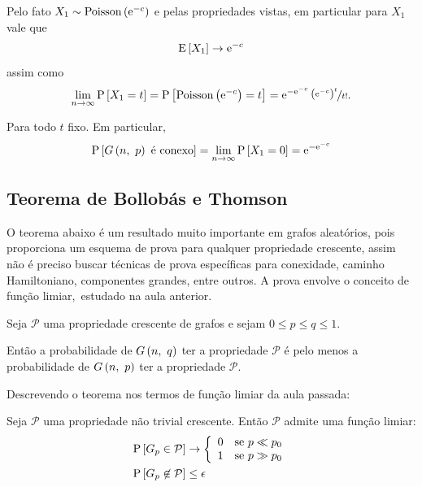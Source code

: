Pelo fato $X_1\sim\mathrm{Poisson}\left(\mathrm{e}^{-c}\vphantom{1j}\right)$ e pelas propriedades vistas, em particular para $X_1$ vale que
\[
  \mathrm{E}\left[X_1\vphantom{1j}\right]\rightarrow\mathrm{e}^{-c}
\]
assim como
\[
  \lim_{n\rightarrow\infty} \mathrm{P}\left[X_1=t\vphantom{1j}\right]
    = \mathrm{P}\left[\mathrm{Poisson}\left(\mathrm{e}^{-c}\vphantom{1j}\right)=t\vphantom{1j}\right]
    = \mathrm{e}^{-\mathrm{e}^{-c}}\,\nicefrac{\left(\mathrm{e}^{-c}\vphantom{1j}\right)^t}{t!}.
\]

Para todo $t$ fixo. Em particular,
\[
  \mathrm{P}\left[G\left(n,\ p\vphantom{1j}\right) \text{ é conexo}\vphantom{1j}\right] = \lim_{n\rightarrow\infty} \mathrm{P}\left[X_1=0\vphantom{1j}\right]=\mathrm{e}^{-\mathrm{e}^{-c}}
\]

\subsection{Teorema de Bollobás e Thomson}

O teorema abaixo é um resultado muito importante em grafos aleatórios, pois proporciona um esquema de prova para qualquer propriedade crescente, assim não é preciso buscar técnicas de prova específicas para conexidade, caminho Hamiltoniano, componentes grandes, entre outros. A prova envolve o conceito de função limiar,\ estudado na aula anterior.

\begin{definicao}
  Seja $\mathcal{P}$ uma propriedade crescente de grafos e sejam $0\leq p\leq q\leq1$.

  Então a probabilidade de $G\left(n,\ q\vphantom{1j}\right)$ ter a propriedade $\mathcal{P}$ é pelo menos a probabilidade de $G\left(n,\ p\vphantom{1j}\right)$ ter a propriedade $\mathcal{P}$.
\end{definicao}

Descrevendo o teorema nos termos de função limiar da aula passada:

\begin{teorema}
  Seja $\mathcal{P}$ uma propriedade não trivial crescente. Então $\mathcal{P}$ admite uma função limiar:
  \begin{align*}
    \mathrm{P}\left[G_p\in\mathcal{P}\vphantom{1j}\right]
      &\rightarrow \left\{\begin{array}{ll}
                      0 & \text{se } p \ll p_0  \\
                      1 & \text{se } p \gg p_0  \\
                    \end{array}\vphantom{1j}\right. \\
    \mathrm{P}\left[G_p\not\in\mathcal{P}\vphantom{1j}\right]
      &\leq\epsilon
  \end{align*}
\end{teorema}

